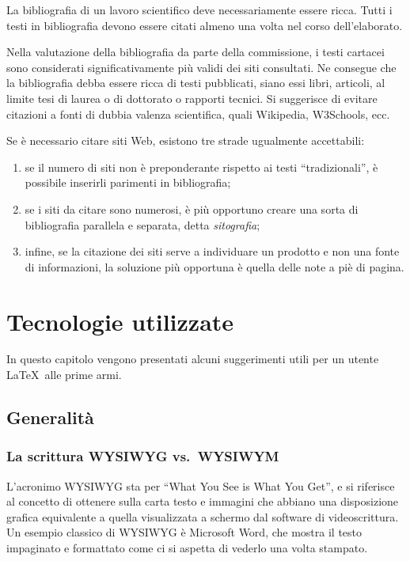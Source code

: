 \documentclass[12pt,italian]{report}
\begin{document}
La bibliografia di un lavoro scientifico deve necessariamente essere ricca. Tutti i testi in bibliografia devono essere citati almeno una volta nel corso dell'elaborato. 

Nella valutazione della bibliografia da parte della commissione, i testi cartacei sono considerati significativamente più validi dei siti consultati. Ne consegue che la bibliografia debba essere ricca di testi pubblicati, siano essi libri, articoli, al limite tesi di laurea o di dottorato o rapporti tecnici. Si suggerisce di evitare citazioni a fonti di dubbia valenza scientifica, quali Wikipedia, W3Schools, ecc.

Se è necessario citare siti Web, esistono tre strade ugualmente accettabili:
\begin{enumerate}
	\item se il numero di siti non è preponderante rispetto ai testi ``tradizionali'', è possibile inserirli parimenti in bibliografia;
	\item se i siti da citare sono numerosi, è più opportuno creare una sorta di bibliografia parallela e separata, detta \textit{sitografia};
	\item infine, se la citazione dei siti serve a individuare un prodotto e non una fonte di informazioni, la soluzione più opportuna è quella delle note a piè di pagina.
\end{enumerate}





% 
% 

\chapter{Tecnologie utilizzate}
\label{cap3}

In questo capitolo vengono presentati alcuni suggerimenti utili per un utente \LaTeX\ alle prime armi.


\section{Generalit\`a}

\subsection{La scrittura WYSIWYG vs.\ WYSIWYM}

L'acronimo WYSIWYG sta per ``What You See is What You Get'', e si riferisce al concetto di ottenere sulla carta testo e immagini che abbiano una disposizione grafica equivalente a quella visualizzata a schermo dal software di videoscrittura. Un esempio classico di WYSIWYG è Microsoft Word, che mostra il testo impaginato e formattato come ci si aspetta di vederlo una volta stampato.
\end{document}
